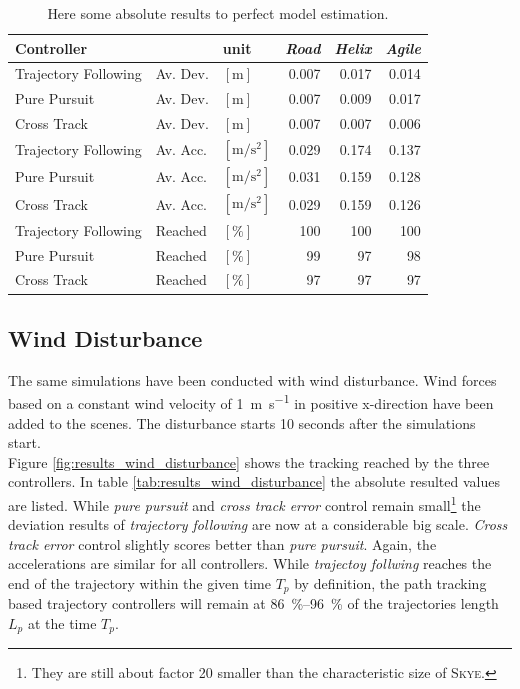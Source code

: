 \begin{table}[h]
\begin{center}
 \begin{tabular}{lll|rrr}
 \hline
 Controller &   & unit & \textit{Road} & \textit{Helix} & \textit{Agile} \\ \hline \hline
 Trajectory Following & Av. Dev. & $[\si{\meter}]$ & 0.007 & 0.017 & 0.014 \\
 Pure Pursuit         & Av. Dev. & $[\si{\meter}]$ & 0.007 & 0.009 & 0.017 \\
 Cross Track          & Av. Dev. & $[\si{\meter}]$ &  0.007 & 0.007 & 0.006 \\
    
 Trajectory Following & Av. Acc. & $[\si{\meter\per\square\second}]$ & 0.029 & 0.174 & 0.137 \\
 Pure Pursuit         & Av. Acc. & $[\si{\meter\per\square\second}]$ & 0.031 & 0.159 & 0.128 \\
 Cross Track          & Av. Acc. & $[\si{\meter\per\square\second}]$ & 0.029 & 0.159 & 0.126 \\
 
 Trajectory Following & Reached & $[\si{\percent}]$ & 100 & 100 & 100 \\
 Pure Pursuit         & Reached & $[\si{\percent}]$ &  99 &  97 &  98 \\
 Cross Track          & Reached & $[\si{\percent}]$ &  97 &  97 &  97 \\
 \hline
 \end{tabular}
 \caption{Here some absolute results to perfect model estimation.}\vspace{1ex}
 \label{tab:results_perfect_model}
\end{center}
\end{table}


\subsection{Wind Disturbance}
\label{sub:results_wind_disturbance}

The same simulations have been conducted with wind disturbance. Wind forces based on a constant wind velocity of \SI{1}{\meter\per\second} in positive x-direction have been added to the scenes. The disturbance starts 10 seconds after the simulations start. \\
Figure \ref{fig:results_wind_disturbance} shows the tracking reached by the three controllers. In table \ref{tab:results_wind_disturbance} the absolute resulted values are listed. While \textit{pure pursuit} and \textit{cross track error} control remain small\footnote{They are still about factor 20 smaller than the characteristic size of \textsc{Skye}.} the deviation results of \textit{trajectory following} are now at a considerable big scale. \textit{Cross track error} control slightly scores better than \textit{pure pursuit}. Again, the accelerations are similar for all controllers. While \textit{trajectoy follwing} reaches the end of the trajectory within the given time $T_p$ by definition, the path tracking based trajectory controllers will remain at \SIrange{86}{96}{\percent} of the trajectories length $L_p$ at the time $T_p$.

